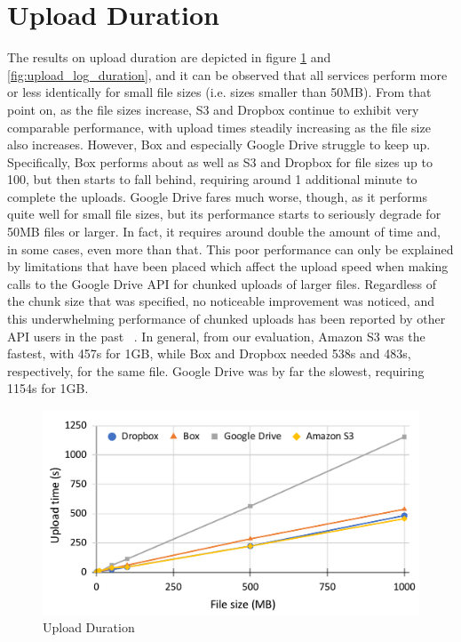 \section{Upload Duration}
The results on upload duration are depicted in figure \ref{fig:upload_duration} and \ref{fig:upload_log_duration}, and it can be observed that all services perform more or less identically for small file sizes (i.e. sizes smaller than 50MB). From that point on,  as the file sizes increase, S3 and Dropbox continue to exhibit very comparable performance, with upload times steadily increasing as the file size also increases.  However, Box and especially Google Drive struggle to keep up. Specifically, Box performs about as well as S3 and Dropbox for file sizes up to 100, but then starts to fall behind, requiring around 1 additional minute to complete the uploads. Google Drive fares much worse, though, as it performs quite well for small file sizes, but its performance starts to seriously degrade for 50MB files or larger. In fact, it requires around double the amount of time and, in some cases, even more than that. This poor performance can only be explained by limitations that have been placed which affect the  upload speed when making calls to the Google Drive API for chunked uploads of larger files. Regardless of the chunk size that was specified, no noticeable improvement was noticed, and this underwhelming performance of chunked uploads has been reported by other API users in the past ~\cite{drive_chunked_performance}. In general, from our evaluation, Amazon S3 was the fastest, with 457s for 1GB, while Box and Dropbox needed 538s and 483s, respectively, for the same file. Google Drive was by far the slowest, requiring 1154s for 1GB.

\begin{figure} []
    \centering
    \includegraphics[scale=0.6]{images/upload_chart}
    \caption{\label{fig:upload_duration}Upload Duration}
\end{figure}

